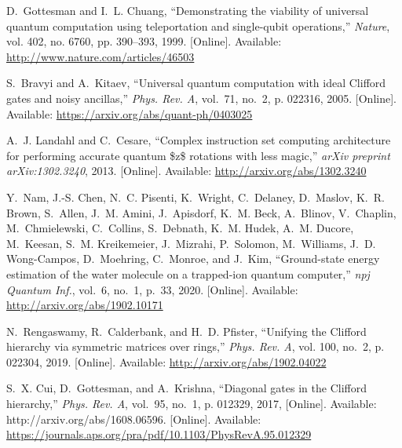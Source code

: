 \documentclass[twoside,romanappendices]{IEEEtran}
\begin{document}
\begin{thebibliography}{10}
\BIBentryALTinterwordspacing
D.~Gottesman and I.~L. Chuang, ``{Demonstrating the viability of universal
  quantum computation using teleportation and single-qubit operations},''
  \emph{Nature}, vol. 402, no. 6760, pp. 390--393, 1999. [Online]. Available:
  \url{http://www.nature.com/articles/46503}
\BIBentrySTDinterwordspacing

\BIBentryALTinterwordspacing
S.~Bravyi and A.~Kitaev, ``{Universal quantum computation with ideal Clifford
  gates and noisy ancillas},'' \emph{Phys. Rev. A}, vol.~71, no.~2, p. 022316,
  2005. [Online]. Available: \url{https://arxiv.org/abs/quant-ph/0403025}
\BIBentrySTDinterwordspacing

\BIBentryALTinterwordspacing
A.~J. Landahl and C.~Cesare, ``Complex instruction set computing architecture
  for performing accurate quantum {\$}z{\$} rotations with less magic,''
  \emph{arXiv preprint arXiv:1302.3240}, 2013. [Online]. Available:
  \url{http://arxiv.org/abs/1302.3240}
\BIBentrySTDinterwordspacing

\BIBentryALTinterwordspacing
Y.~Nam, J.-S. Chen, N.~C. Pisenti, K.~Wright, C.~Delaney, D.~Maslov, K.~R.
  Brown, S.~Allen, J.~M. Amini, J.~Apisdorf, K.~M. Beck, A.~Blinov, V.~Chaplin,
  M.~Chmielewski, C.~Collins, S.~Debnath, K.~M. Hudek, A.~M. Ducore, M.~Keesan,
  S.~M. Kreikemeier, J.~Mizrahi, P.~Solomon, M.~Williams, J.~D. Wong-Campos,
  D.~Moehring, C.~Monroe, and J.~Kim, ``{Ground-state energy estimation of the
  water molecule on a trapped-ion quantum computer},'' \emph{npj Quantum Inf.},
  vol.~6, no.~1, p.~33, 2020. [Online]. Available:
  \url{http://arxiv.org/abs/1902.10171}
\BIBentrySTDinterwordspacing

\BIBentryALTinterwordspacing
N.~Rengaswamy, R.~Calderbank, and H.~D. Pfister, ``Unifying the {C}lifford
  hierarchy via symmetric matrices over rings,'' \emph{Phys. Rev. A}, vol. 100,
  no.~2, p. 022304, 2019. [Online]. Available:
  \url{http://arxiv.org/abs/1902.04022}
\BIBentrySTDinterwordspacing

\BIBentryALTinterwordspacing
S.~X. Cui, D.~Gottesman, and A.~Krishna, ``{Diagonal gates in the Clifford
  hierarchy},'' \emph{Phys. Rev. A}, vol.~95, no.~1, p. 012329, 2017, [Online].
  Available: http://arxiv.org/abs/1608.06596. [Online]. Available:
  \url{https://journals.aps.org/pra/pdf/10.1103/PhysRevA.95.012329}
\BIBentrySTDinterwordspacing


\end{thebibliography}
\end{document}
